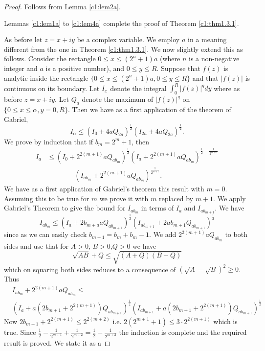 \begin{proof}
Follows from Lemma \ref{c1:lem2a}.


Lemmas \ref{c1:lem1a} to \ref{c1:lem4a} complete the proof of Theorem \ref{c1:thm1.3.1}. 

As before let $z = x + iy$ be a complex variable. We employ $a$ in a  meaning different from the one in Theorem \ref{c1:thm1.3.1}. We now slightly extend  this as follows. Consider the rectangle $0 \leq x \leq (2^n+1)a$ (where $n$ is a non-negative integer and $a$ is a positive number), and $0 \leq y \leq R$. Suppose that $f(z)$ is analytic inside the rectangle $\{0 \leq x \leq (2^n +1)a, 0 \leq y \leq R\}$ and that\pageoriginale
$|f(z)|$ is continuous on its boundary. Let $I_x$ denote the integral $\int^R_0|f(z)|^q dy$ where as before $z = x + iy$. Let $Q_a$ denote the maximum of $|f(z)|^q$ on $\{0 \leq x \leq \alpha , y = 0,R\}$. Then we have as a first application of the theorem of Gabriel,
$$
I_\alpha \leq \left(I_0 + 4 a Q_{2a} \right)^{\frac{1}{2}} \left(I_{2a} + 4a Q_{2a}  \right)^{\frac{1}{2}}.
$$
We prove by induction that if $b_m = 2^m +1$, then
\begin{align*}
I_a &\leq  \left(I_0 + 2^{2(m+1)} a Q _{ab_m} \right)^{\frac{1}{2}}
\left(I_a + 2^{2(m+1)} a Q_{ab_m} \right)^{\frac{1}{2} -
  \frac{1}{2^{m+1}}}\\ 
&\qquad\qquad \left( I_{ab_m} + 2^{2(m+1)} a
Q_{ab_m}\right)^{\frac{1}{2^{m+1}}}. 
\end{align*}
We have as a first application of Gabriel's theorem this result with $m=0$. Assuming this to be true for $m$ we prove it with $m$ replaced by $m+1$. We apply Gabriel's Theorem to give the bound for $I_{ab_m}$ in terms of $I_a$ and $I_{ab_{m+1}}$. We have
$$
I_{ab_m} \leq \left(I_a + 2b_{m+a} a Q_{ab_{m+1}} \right)^{\frac{1}{2}} \left(I_{ab_{m+1}} + 2ab_{m+1} Q_{ab_{m+1}}\right)^{\frac{1}{2}}
$$
since as we can easily check $b_{m+1} = b_m+b_m-1$. We add $2^{2(m+1)} a Q_{ab_m}$ to both sides and use that for $A >0$, $B > 0$,$Q > 0$ we have
$$
\sqrt{AB} + Q \leq \sqrt{(A+Q) (B+Q)}
$$
which on squaring both sides reduces to a consequence of $(\sqrt{A} - \sqrt{B})^2 \geq 0$. Thus
\begin{align*}
& I_{ab_m} + 2^{2(m+1)} a Q_{ab_m} \leq \\
& \left(I_a + a (2b_{m+1} + 2^{2(m+1)}) Q_{ab_{m+1}} \right)^{\frac{1}{2}} \left(I_{ab_{m+1}} + a \left(2b_{m+1} + 2^{2(m+1)}  \right) Q_{ab_{m+1}}\right)^{\frac{1}{2}}
\end{align*}
Now $2b_{m+1} + 2^{2(m+1)} \leq 2^{2(m+2)}$ i.e. $2(2^{m+1} +1) \leq 3 \cdot 2^{2(m+1)}$ which is true. Since $\frac{1}{2} - \frac{1}{2^{m+1}} + \frac{1}{2^{m+2}} = \frac{1}{2} - \frac{1}{2^{m+2}}$ the induction is complete and the required result is proved. We state it as a 
\end{proof}


